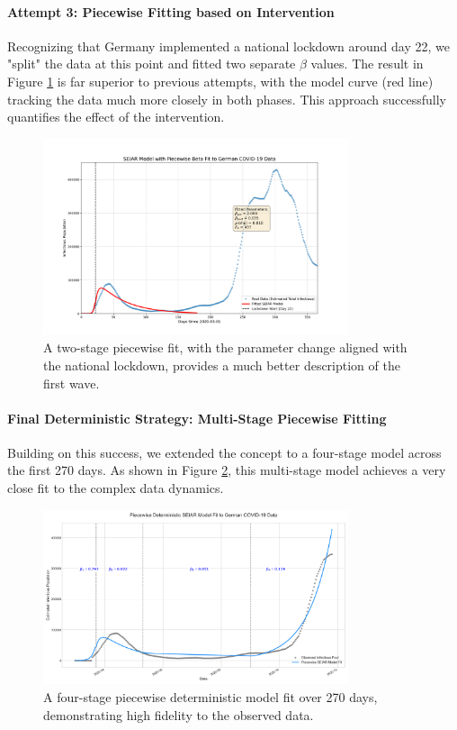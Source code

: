 \documentclass[12pt, a4paper]{article}
\begin{document}
\paragraph{Attempt 3: Piecewise Fitting based on Intervention}
Recognizing that Germany implemented a national lockdown around day 22, we "split" the data at this point and fitted two separate $\beta$ values. The result in Figure \ref{fig:linear_1} is far superior to previous attempts, with the model curve (red line) tracking the data much more closely in both phases. This approach successfully quantifies the effect of the intervention.

\begin{figure}[h!]
    \centering
    \includegraphics[width=0.8\textwidth]{1/linear_1.png}
    \caption{A two-stage piecewise fit, with the parameter change aligned with the national lockdown, provides a much better description of the first wave.}
    \label{fig:linear_1}
\end{figure}

\paragraph{Final Deterministic Strategy: Multi-Stage Piecewise Fitting}
Building on this success, we extended the concept to a four-stage model across the first 270 days. As shown in Figure \ref{fig:linear_2}, this multi-stage model achieves a very close fit to the complex data dynamics.

\begin{figure}[h!]
    \centering
    \includegraphics[width=0.8\textwidth]{1/linear_2.png}
    \caption{A four-stage piecewise deterministic model fit over 270 days, demonstrating high fidelity to the observed data.}
    \label{fig:linear_2}
\end{figure}
\end{document}
